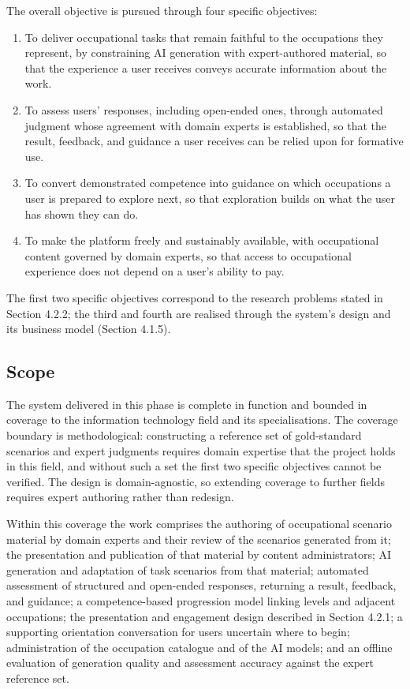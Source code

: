The overall objective is pursued through four specific objectives:

\begin{enumerate}[leftmargin=1.5em]
  \item To deliver occupational tasks that remain faithful to the occupations they represent, by constraining AI generation with expert-\allowbreak{}authored material, so that the experience a user receives conveys accurate information about the work.
  \item To assess users' responses, including open-ended ones, through automated judgment whose agreement with domain experts is established, so that the result, feedback, and guidance a user receives can be relied upon for formative use.
  \item To convert demonstrated competence into guidance on which occupations a user is prepared to explore next, so that exploration builds on what the user has shown they can do.
  \item To make the platform freely and sustainably available, with occupational content governed by domain experts, so that access to occupational experience does not depend on a user's ability to pay.
\end{enumerate}

The first two specific objectives correspond to the research problems stated in Section 4.2.2; the third and fourth are realised through the system's design and its business model (Section 4.1.5).

\subsection{Scope}

The system delivered in this phase is complete in function and bounded in coverage to the information technology field and its specialisations. The coverage boundary is methodological: constructing a reference set of gold-\allowbreak{}standard scenarios and expert judgments requires domain expertise that the project holds in this field, and without such a set the first two specific objectives cannot be verified. The design is domain-\allowbreak{}agnostic, so extending coverage to further fields requires expert authoring rather than redesign.

Within this coverage the work comprises the authoring of occupational scenario material by domain experts and their review of the scenarios generated from it; the presentation and publication of that material by content administrators; AI generation and adaptation of task scenarios from that material; automated assessment of structured and open-ended responses, returning a result, feedback, and guidance; a competence-\allowbreak{}based progression model linking levels and adjacent occupations; the presentation and engagement design described in Section 4.2.1; a supporting orientation conversation for users uncertain where to begin; administration of the occupation catalogue and of the AI models; and an offline evaluation of generation quality and assessment accuracy against the expert reference set.

